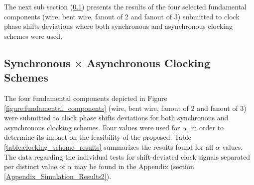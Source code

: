 The next sub section (\ref{subsection:Synchronous_Asynchronous_Clocking_Schemes}) presents the results of the four selected fundamental components (wire, bent wire, fanout of 2 and fanout of 3) submitted to clock phase shifts deviations where both synchronous and asynchronous clocking schemes were used.

\subsection{Synchronous $\times$ Asynchronous Clocking Schemes}
\label{subsection:Synchronous_Asynchronous_Clocking_Schemes}

The four fundamental components depicted in Figure \ref{figure:fundamental_components} (wire, bent wire, fanout of 2 and fanout of 3) were submitted to clock phase shifts deviations for both synchronous and asynchronous clocking schemes. Four values were used for $\alpha$, in order to determine its impact on the feasibility of the proposed. Table \ref{table:clocking_scheme_results} summarizes the results found for all $\alpha$ values. The data regarding the individual tests for shift-deviated clock signals separated per distinct value of $\alpha$ may be found in the Appendix (section \ref{Appendix_Simulation_Results2}).

